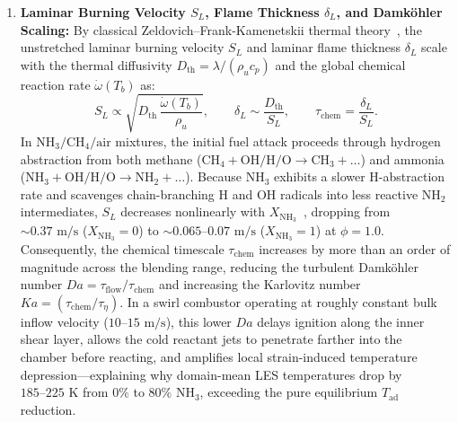 \begin{enumerate}
    \item \textbf{Laminar Burning Velocity $S_L$, Flame Thickness $\delta_L$, and Damk\"ohler Scaling:} By classical Zeldovich--Frank-Kamenetskii thermal theory~\cite{poinsot2005theoretical}, the unstretched laminar burning velocity $S_L$ and laminar flame thickness $\delta_L$ scale with the thermal diffusivity $D_{\text{th}} = \lambda / (\rho_u c_p)$ and the global chemical reaction rate $\dot{\omega}(T_b)$ as:
    \begin{equation}
        S_L \propto \sqrt{D_{\text{th}} \, \frac{\dot{\omega}(T_b)}{\rho_u}}, \qquad \delta_L \sim \frac{D_{\text{th}}}{S_L}, \qquad \tau_{\text{chem}} = \frac{\delta_L}{S_L}.
        \label{eq:bg_sl_scaling}
    \end{equation}
    In $\text{NH}_3/\text{CH}_4/\text{air}$ mixtures, the initial fuel attack proceeds through hydrogen abstraction from both methane ($\text{CH}_4 + \text{OH/H/O} \rightarrow \text{CH}_3 + \dots$) and ammonia ($\text{NH}_3 + \text{OH/H/O} \rightarrow \text{NH}_2 + \dots$). Because $\text{NH}_3$ exhibits a slower H-abstraction rate and scavenges chain-branching $\text{H}$ and $\text{OH}$ radicals into less reactive $\text{NH}_2$ intermediates, $S_L$ decreases nonlinearly with $X_{\text{NH}_3}$~\cite{okafor2018experimental}, dropping from $\sim 0.37\text{ m/s}$ ($X_{\text{NH}_3}=0$) to $\sim 0.065\text{--}0.07\text{ m/s}$ ($X_{\text{NH}_3}=1$) at $\phi=1.0$. Consequently, the chemical timescale $\tau_{\text{chem}}$ increases by more than an order of magnitude across the blending range, reducing the turbulent Damk\"ohler number $Da = \tau_{\text{flow}} / \tau_{\text{chem}}$ and increasing the Karlovitz number $Ka = (\tau_{\text{chem}} / \tau_\eta)$. In a swirl combustor operating at roughly constant bulk inflow velocity ($10\text{--}15\text{ m/s}$), this lower $Da$ delays ignition along the inner shear layer, allows the cold reactant jets to penetrate farther into the chamber before reacting, and amplifies local strain-induced temperature depression---explaining why domain-mean LES temperatures drop by $185\text{--}225\text{ K}$ from $0\%$ to $80\%\text{ NH}_3$, exceeding the pure equilibrium $T_{\text{ad}}$ reduction.


\end{enumerate}

